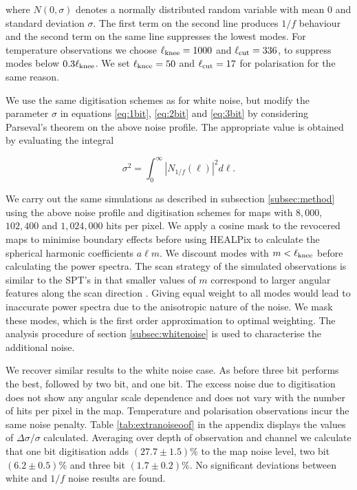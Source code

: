 \documentclass[apj]{emulateapj}
\newcommand{\lknee}{\ensuremath{\ell_{\rm knee}}}
\newcommand{\lcut}{\ensuremath{\ell_{\rm cut}}}
\begin{document}
where $N\left(0, \sigma \right)$ denotes a normally distributed random variable with mean $0$ and standard deviation $\sigma$. The first term on the second line produces $1/f$ behaviour and the second term on the same line suppresses the lowest modes. For temperature observations we choose $\lknee = 1000$ and $\lcut = 336$, to suppress modes below $0.3 \lknee$. We set $\lknee = 50$ and $\lcut = 17$ for polarisation for the same reason.

We use the same digitisation schemes as for white noise, but modify the parameter $\sigma$ in equations \ref{eq:1bit}, \ref{eq:2bit} and \ref{eq:3bit} by considering Parseval's theorem on the above noise profile. The appropriate value is obtained by evaluating the integral

\begin{equation}
\sigma^2 = \int_0^\infty \left| N_{1/f}(\ell) \right|^2 d\ell.
\end{equation}

We carry out the same simulations as described in subsection \ref{subsec:method} using the above noise profile and digitisation schemes for maps with $8,000$, $102,400$ and $1,024,000$ hits per pixel. We apply a cosine mask to the revocered maps to minimise boundary effects before using HEALPix to calculate the spherical harmonic coefficients $a\ell m$. We discount modes with $m < \lknee$ before calculating the power spectra. The scan strategy of the simulated observations is similar to the SPT's in that smaller values of $m$ correspond to larger angular features along the scan direction \citep{chown2018}. Giving equal weight to all modes would lead to inaccurate power spectra due to the anisotropic nature of the noise. We mask these modes, which is the first order approximation to optimal weighting. The analysis procedure of section \ref{subsec:whitenoise} is used to characterise the additional noise.

We recover similar results to the white noise case. As before three bit performs the best, followed by two bit, and one bit. The excess noise due to digitisation does not show any angular scale dependence and does not vary with the number of hits per pixel in the map. Temperature and polarisation observations incur the same noise penalty. Table \ref{tab:extranoiseoof} in the appendix displays the values of $\Delta \sigma / \sigma$ calculated. Averaging over depth of observation and channel we calculate that one bit digitisation adds $(27.7\pm 1.5)\%$ to the map noise level, two bit $(6.2\pm0.5)\%$ and three bit $(1.7\pm0.2)\%$. No significant deviations between white and $1/f$ noise results are found.
\end{document}
